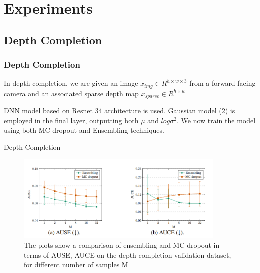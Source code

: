 \documentclass{beamer}
\begin{document}
\section{Experiments}
\subsection{Depth Completion}
\begin{frame}
\frametitle{Depth Completion}

\hspace{0.3cm} In depth completion, we are given an image $x_{img} \in R^{h\times w\times 3}$ from a forward-facing camera and an associated sparse depth map $x_{sparse} \in R^{h\times w}$

\vspace{0.3cm}

\hspace{0.3cm} DNN model based on Resnet 34 architecture is used. Gaussian model (2) is employed in the final layer, outputting both $\mu$ and $log \sigma^2$. We now train the model using both MC dropout and Ensembling techniques.

\end{frame}



\begin{frame}{Depth Completion}

\begin{figure}
\centering
    \includegraphics[width=10cm]{depth.png}
    \caption{The plots show a comparison of ensembling and MC-dropout in terms of
AUSE, AUCE on the depth completion validation dataset, for different number of samples M}
    \label{fig:question}
\end{figure}

\end{frame}

\end{document}
